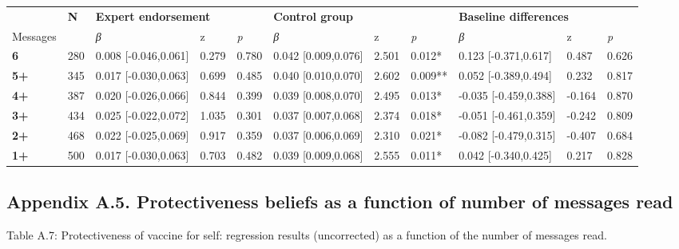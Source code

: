 \documentclass[authordate, empirical]{jote-new-article}
\begin{document}
	\begin{table}
		\begin{tabularx}{\linewidth}{@{} l l l l l l l l l l l @{}}
			\hline  & \textbf{N} & \multicolumn{2}{l}{\textbf{Expert endorsement}} &  &
			\multicolumn{2}{l}{\textbf{Control group}} &  &
			\multicolumn{2}{l}{\textbf{Baseline differences}} &  \\

			 Messages &  & \emph{β} & z & \emph{p} & \emph{β} & z & \emph{p} &
			\emph{β} & z & \emph{p} \\

			\hline \textbf{6} & 280 & 0.008 [-0.046,0.061] & 0.279 & 0.780 & 0.042 [0.009,0.076]
			& 2.501 & 0.012* & 0.123 [-0.371,0.617] & 0.487 & 0.626 \\

			 \textbf{5+} & 345 & 0.017 [-0.030,0.063] & 0.699 & 0.485 & 0.040 [0.010,0.070]
			& 2.602 & 0.009** & 0.052 [-0.389,0.494] & 0.232 & 0.817 \\

			 \textbf{4+} & 387 & 0.020 [-0.026,0.066] & 0.844 & 0.399 & 0.039 [0.008,0.070]
			& 2.495 & 0.013* & -0.035 [-0.459,0.388] & -0.164 & 0.870 \\

			 \textbf{3+} & 434 & 0.025 [-0.022,0.072] & 1.035 & 0.301 & 0.037 [0.007,0.068]
			& 2.374 & 0.018* & -0.051 [-0.461,0.359] & -0.242 & 0.809 \\

			 \textbf{2+} & 468 & 0.022 [-0.025,0.069] & 0.917 & 0.359 & 0.037 [0.006,0.069]
			& 2.310 & 0.021* & -0.082 [-0.479,0.315] & -0.407 & 0.684 \\

			 \textbf{1+} & 500 & 0.017 [-0.030,0.063] & 0.703 & 0.482 & 0.039 [0.009,0.068]
			& 2.555 & 0.011* & 0.042 [-0.340,0.425] & 0.217 & 0.828 \\


		\end{tabularx}
	\end{table}

	\subsection{Appendix A.5. Protectiveness beliefs as a function of number of messages read}



	Table A.7: Protectiveness of vaccine for self: regression results (uncorrected) as a function of the number of messages read.
\end{document}
